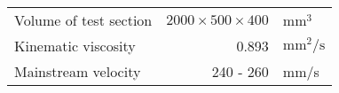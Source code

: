 \documentclass[a4j]{jsarticle}
\begin{document}
\begin{table}[h]
  \label{table:data_type}
  \centering
  \begin{tabular}{l r l}
    \hline
    Volume of test section & $2000 \times 500 \times 400 $ & $\mathrm{mm}^3$              \\
    Kinematic viscosity    & 0.893                         & $\mathrm{mm}^2 / \mathrm{s}$ \\
    Mainstream velocity    & 240 - 260                     & mm/s                         \\ \hline
  \end{tabular}
\end{table}
\end{document}
